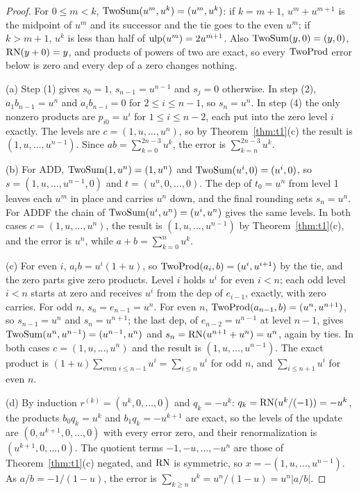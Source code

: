 \begin{proof}
For $0 \le m < k$, $\mathrm{TwoSum}(u^m, u^k) = (u^m, u^k)$: if $k = m + 1$, $u^m + u^{m+1}$ is the midpoint of $u^m$ and its
successor and the tie goes to the even $u^m$; if $k > m+1$, $u^k$ is less than half of $\mathrm{ulp}(u^m) = 2u^{m+1}$. Also
$\mathrm{TwoSum}(y, 0) = (y, 0)$, $\mathrm{RN}(y + 0) = y$, and products of powers of two are exact, so every $\mathrm{TwoProd}$ error below is
zero and every dep of a zero changes nothing.

(a) Step (1) gives $s_0 = 1$, $s_{n-1} = u^{n-1}$ and $s_j = 0$ otherwise. In step (2), $a_1b_{n-1} = u^n$ and
$a_ib_{n-i} = 0$ for $2 \le i \le n-1$, so $s_n = u^n$. In step (4) the only nonzero products are $p_{i0} = u^i$ for $1
\le i \le n-2$, each put into the zero level $i$ exactly. The levels are $c = (1, u, \dots, u^n)$, so by
Theorem~\ref{thm:t1}(c) the result is $(1, u, \dots, u^{n-1})$. Since $ab = \sum_{k=0}^{2n-3}u^k$, the error is
$\sum_{k=n}^{2n-3}u^k$.

(b) For ADD, $\mathrm{TwoSum}(1, u^n) = (1, u^n)$ and $\mathrm{TwoSum}(u^i, 0) = (u^i, 0)$, so $s = (1, u, \dots, u^{n-1}, 0)$ and $t =
(u^n, 0, \dots, 0)$. The dep of $t_0 = u^n$ from level 1 leaves each $u^m$ in place and carries $u^n$ down, and the
final rounding sets $s_n = u^n$. For ADDF the chain of $\mathrm{TwoSum}(u^i, u^n) = (u^i, u^n)$ gives the same levels. In both
cases $c = (1, u, \dots, u^n)$, the result is $(1, u, \dots, u^{n-1})$ by Theorem~\ref{thm:t1}(c), and the error is
$u^n$, while $a + b = \sum_{k=0}^n u^k$.

(c) For even $i$, $a_ib = u^i(1+u)$, so $\mathrm{TwoProd}(a_i, b) = (u^i, u^{i+1})$ by the tie, and the zero parts give zero
products. Level $i$ holds $u^i$ for even $i < n$; each odd level $i < n$ starts at zero and receives $u^i$ from the dep
of $e_{i-1}$, exactly, with zero carries. For odd $n$, $s_n = e_{n-1} = u^n$. For even $n$, $\mathrm{TwoProd}(a_{n-1}, b) =
(u^n, u^{n+1})$, so $s_{n-1} = u^n$ and $s_n = u^{n+1}$; the last dep, of $e_{n-2} = u^{n-1}$ at level $n-1$, gives
$\mathrm{TwoSum}(u^n, u^{n-1}) = (u^{n-1}, u^n)$ and $s_n = \mathrm{RN}(u^{n+1} + u^n) = u^n$, again by ties. In both cases $c = (1,
u, \dots, u^n)$ and the result is $(1, u, \dots, u^{n-1})$. The exact product is $(1+u)\sum_{\text{even } i \le n-1}
u^i = \sum_{i \le n} u^i$ for odd $n$, and $\sum_{i \le n+1}u^i$ for even $n$.

(d) By induction $r^{(k)} = (u^k, 0, \dots, 0)$ and $q_k = -u^k$: $q_k = \mathrm{RN}(u^k/(-1)) = -u^k$, the products $b_0q_k =
u^k$ and $b_1q_k = -u^{k+1}$ are exact, so the levels of the update are $(0, u^{k+1}, 0, \dots, 0)$ with every error
zero, and their renormalization is $(u^{k+1}, 0, \dots, 0)$. The quotient terms $-1, -u, \dots, -u^n$ are those of
Theorem~\ref{thm:t1}(c) negated, and $\mathrm{RN}$ is symmetric, so $x = -(1, u, \dots, u^{n-1})$. As $a/b = -1/(1-u)$, the
error is $\sum_{k \ge n}u^k = u^n/(1-u) = u^n|a/b|$.
\end{proof}

